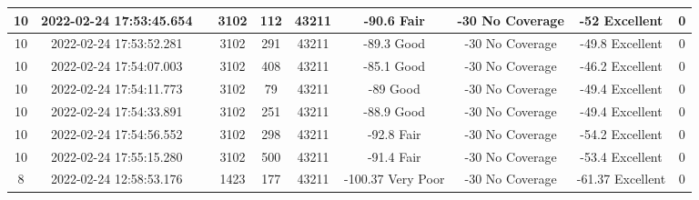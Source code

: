 \begin{longtable*}{|c|c|c|c|c|c|c|c|c|c|}
10&2022-02-24 17:53:45.654&&3102&112&43211& -90.6     Fair        & -30       No Coverage & -52       Excellent   & 0\\\hline
{}10&2022-02-24 17:53:52.281&&3102&291&43211& -89.3     Good        & -30       No Coverage & -49.8     Excellent   & 0\\\hline
{}10&2022-02-24 17:54:07.003&&3102&408&43211& -85.1     Good        & -30       No Coverage & -46.2     Excellent   & 0\\\hline
{}10&2022-02-24 17:54:11.773&&3102&79&43211& -89       Good        & -30       No Coverage & -49.4     Excellent   & 0\\\hline
{}10&2022-02-24 17:54:33.891&&3102&251&43211& -88.9     Good        & -30       No Coverage & -49.4     Excellent   & 0\\\hline
{}10&2022-02-24 17:54:56.552&&3102&298&43211& -92.8     Fair        & -30       No Coverage & -54.2     Excellent   & 0\\\hline
{}10&2022-02-24 17:55:15.280&&3102&500&43211& -91.4     Fair        & -30       No Coverage & -53.4     Excellent   & 0\\\hline
{}8&2022-02-24 12:58:53.176&&1423&177&43211& -100.37   Very Poor   & -30       No Coverage & -61.37    Excellent   & 0\\\hline

\end{longtable*}
